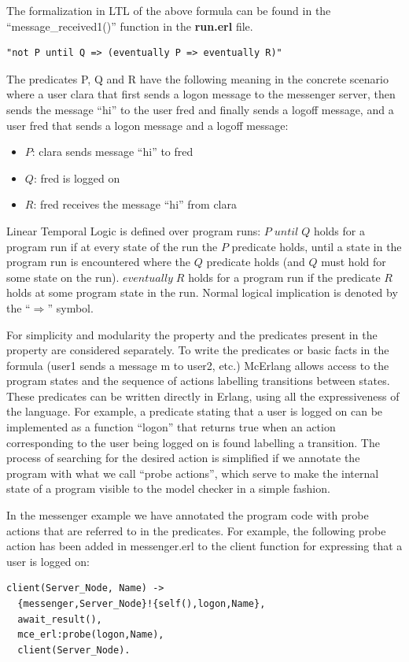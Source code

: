 \documentclass[a4paper]{article}
\begin{document}
The formalization in LTL of the above formula can be found in the
``message\_received1()'' function in the {\bf run.erl} file. 

\begin{verbatim}
"not P until Q => (eventually P => eventually R)"
\end{verbatim}

The predicates P, Q and R have the following meaning in the concrete
scenario where a user clara that first sends a logon message to the
messenger server, then sends the message ``hi'' to the user fred and
finally sends a logoff message, and a user fred that sends a logon
message and a logoff message:
\begin{itemize}
  \item $\mathit{P}$: clara sends message ``hi'' to fred
  \item $\mathit{Q}$: fred is logged on
  \item $\mathit{R}$: fred receives the message ``hi'' from clara
\end{itemize}

Linear Temporal Logic is defined over program runs:
$\mathit{P}\;\mathit{until}\;\mathit{Q}$ holds for a program run
if at every state of the run 
the $\mathit{P}$ predicate holds, until a state in the program run
is encountered where the $\mathit{Q}$ predicate holds (and $\mathit{Q}$
must hold for some state on the run).
$\mathit{eventually}\;\mathit{R}$ holds for a program run if the
predicate $\mathit{R}$ holds at some program state in the run.
Normal logical implication is denoted by the ``$\Rightarrow$'' symbol.


For simplicity and modularity the property and the predicates present
in the property are considered separately. To write the predicates or
basic facts in the formula (user1 sends a message m to user2, etc.)
McErlang allows access to the program states and the sequence of
actions labelling transitions between states.  These predicates can be
written directly in Erlang, using all the expressiveness of the
language. For example, a predicate stating that a user is logged on
can be implemented as a function ``logon'' that returns true when an
action corresponding to the user being logged on is found labelling a
transition.  The process of searching for the desired action is
simplified if we annotate the program with what we call ``probe
actions'', which serve to make the internal state of a program visible
to the model checker in a simple fashion.

In the messenger example we have annotated the program code with probe
actions that are referred to in the predicates. For example, the
following probe action has been added in messenger.erl to the client
function for expressing that a user is logged on:
\begin{lstlisting}
client(Server_Node, Name) -> 
  {messenger,Server_Node}!{self(),logon,Name}, 
  await_result(), 
  mce_erl:probe(logon,Name),
  client(Server_Node).
\end{lstlisting}
\end{document}
